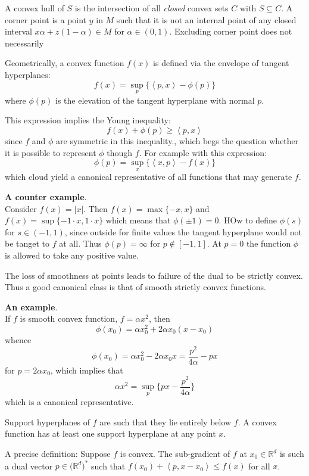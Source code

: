 \documentclass[a4paper]{article}
\newcommand{\brkt}[1]{{\left\langle #1 \right\rangle}}
\newcommand{\Real}{\mathbb{R}}
\begin{document}
A convex hull of $S$ is the intersection of all \emph{closed} convex sets $C$ with $S\subseteq C$. A corner point is a point $y$ in $M$ such that it is not an internal point of any closed interval $x\alpha + z(1-\alpha)\in M$ for $\alpha\in(0,1)$. Excluding corner point does not necessarily 

Geometrically, a convex function $f(x)$ is defined via the envelope of tangent hyperplanes:
\[f(x) = \sup_p \big\{ \brkt{p,x} - \phi(p) \big\}\]
where $\phi(p)$ is the elevation of the tangent hyperplane with normal $p$.

This expression implies the Young inequality:
\[f(x) + \phi(p) \geq \brkt{p,x}\]
since $f$ and $\phi$ are symmetric in this inequality., which begs the question whether it is possible to represent $\phi$ though $f$.
For example with this expression:
\[\phi(p) = \sup_x \big\{\brkt{x,p}-f(x)\big\}\]
which cloud yield a canonical representative of all functions that may generate $f$.

\textbf{A counter example}.\hfill \\
Consider $f(x) = \lvert x \rvert$. Then $f(x) = \max\{-x,x\}$ and $f(x) = \sup\{-1\cdot x, 1\cdot x\}$
which means that $\phi(\pm1)=0$. HOw to define $\phi(s)$ for $s\in (-1,1)$, since outside for finite values the tangent hyperplane would not be tanget to $f$ at all. Thus $\phi(p)=\infty$ for $p\notin [-1,1]$. At $p=0$ the function $\phi$ is allowed to take any positive value.

The loss of smoothness at points leads to failure of the dual to be strictly convex.
Thus a good canonical class is that of smooth strictly convex functions.

\textbf{An example}.\hfill \\
If $f$ is smooth convex function, $f=\alpha x^2$, then
\[\phi(x_0) = \alpha x_0^2 + 2\alpha x_0 (x-x_0)\]
whence 
\[\phi(x_0) = \alpha x_0^2 - 2\alpha x_0 x = \frac{p^2}{4 \alpha} - p x\]
for $p = 2\alpha x_0$, which implies that
\[\alpha x^2 = \sup_{p} \big\{ px - \frac{p^2}{4\alpha}\big\}\]
which is a canonical representative.

Support hyperplanes of $f$ are such that they lie entirely below $f$.
A convex function has at least one support hyperplane at any point $x$.

A precise definition:
Suppose $f$ is convex. The sub-gradient of $f$ at $x_0\in \Real^d$ is such a dual vector
$p\in\big(\Real^d)^*$ such that $f(x_0)+\brkt{p, x-x_0}\leq f(x)$ for all $x$.
\end{document}
